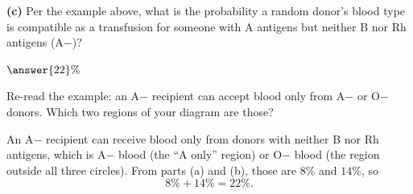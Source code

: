 \documentclass[12pt]{ximera}
\begin{document}
\begin{problem}
\begin{prompt}
\textbf{(c)} Per the example above, what is the probability a random donor's blood
type is compatible as a transfusion for someone with A antigens but neither B nor Rh
antigens (A$-$)?

$\answer{22}\%$

\begin{hint}
Re-read the example: an A$-$ recipient can accept blood only from A$-$ or O$-$
donors. Which two regions of your diagram are those?
\end{hint}

\begin{feedback}
An A$-$ recipient can receive blood only from donors with neither B nor Rh antigens,
which is A$-$ blood (the ``A only'' region) or O$-$ blood (the region outside all
three circles). From parts (a) and (b), those are $8\%$ and $14\%$, so
\[ 8\% + 14\% = 22\%. \]
\end{feedback}
\end{prompt}
\end{problem}
\end{document}
